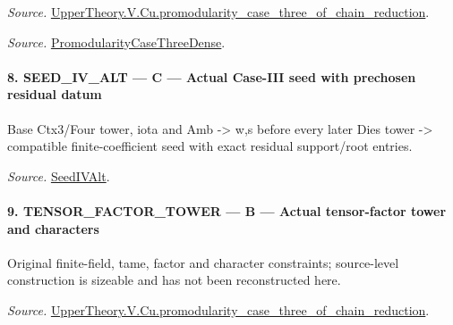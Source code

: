 \documentclass[11pt,a4paper]{article}
\numberwithin{equation}{section}
\theoremstyle{remark}\newtheorem{remark}[theorem]{Remark}
\begin{document}
\emph{Source.} \href{https://github.com/CocoSgt/riemann-hypothesis-lean/blob/7cbf7a0c32fca1badf05931879a37c3f8a2b03b4/src/Development/AutomorphicArithmetic/AutomorphicVarieties/ModularityArgument/ThresholdArguments/DenseThresholdCases/PromodularityCaseThreeOfLemmas.lean#L131-L153}{UpperTheory.V.Cu.promodularity\_\allowbreak case\_\allowbreak three\_\allowbreak of\_\allowbreak chain\_\allowbreak reduction}.

\emph{Source.} \href{https://github.com/CocoSgt/riemann-hypothesis-lean/blob/7cbf7a0c32fca1badf05931879a37c3f8a2b03b4/src/Development/AutomorphicArithmetic/AutomorphicVarieties/ModularityArgument/ThresholdArguments/DenseThresholdCases/PromodularityCaseThree.lean#L40-L42}{PromodularityCaseThreeDense}.



\paragraph{8. SEED\_\allowbreak IV\_\allowbreak ALT — C — Actual Case-III seed with prechosen residual datum}

Base Ctx3/Four tower, iota and Amb -> w,s before every later Dies tower -> compatible finite-coefficient seed with exact residual support/root entries.

\emph{Source.} \href{https://github.com/CocoSgt/riemann-hypothesis-lean/blob/7cbf7a0c32fca1badf05931879a37c3f8a2b03b4/src/Development/AutomorphicArithmetic/AutomorphicVarieties/ModularityArgument/ThresholdArguments/DenseThresholdCases/PromodularityCaseThree.lean#L19-L25}{SeedIVAlt}.



\paragraph{9. TENSOR\_\allowbreak FACTOR\_\allowbreak TOWER — B — Actual tensor-factor tower and characters}

Original finite-field, tame, factor and character constraints; source-level construction is sizeable and has not been reconstructed here.

\emph{Source.} \href{https://github.com/CocoSgt/riemann-hypothesis-lean/blob/7cbf7a0c32fca1badf05931879a37c3f8a2b03b4/src/Development/AutomorphicArithmetic/AutomorphicVarieties/ModularityArgument/ThresholdArguments/DenseThresholdCases/PromodularityCaseThreeOfLemmas.lean#L131-L153}{UpperTheory.V.Cu.promodularity\_\allowbreak case\_\allowbreak three\_\allowbreak of\_\allowbreak chain\_\allowbreak reduction}.
\end{document}

